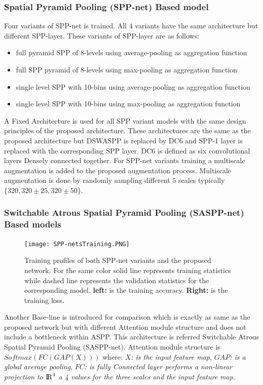 \subsubsection{Spatial Pyramid Pooling (SPP-net) Based model}
Four variants of SPP-net\cite{he2015spatial} is trained. All $4$ variants have the same architecture but different SPP-layer. These variants of SPP-layer are as follows:
\begin{itemize}
  \item full pyramid SPP of 8-levels using average-pooling as aggregation function
  \item full SPP pyramid of 8-levels using max-pooling as aggregation function
  \item single level SPP with 10-bins using average-pooling as aggregation function
  \item single level SPP with 10-bins using max-pooling as aggregation function
\end{itemize}
  A Fixed Architecture is used for all SPP variant models with the same design principles of the proposed architecture. These architectures are the same as the proposed architecture but DSWASPP is replaced by DC6 and SPP-1 layer is replaced with the corresponding SPP layer. DC6 is defined as six convolutional layers Densely connected together. For SPP-net variants training a multiscale augmentation is added to the proposed augmentation process. Multiscale augmentation is done by randomly sampling different $5$ scales typically $\{320, 320\pm25, 320\pm50 \}$.
\subsubsection{Switchable Atrous Spatial Pyramid Pooling (SASPP-net) Based models} 
\begin{center}
\begin{figure}[htbp]
\centerline{\texttt{[image: SPP-netsTraining.PNG]}}
\caption{Training profiles of both SPP-net variants and the proposed network. For the same color solid line represents training statistics while dashed line represents the validation statistics for the corresponding model. \textbf{left:} is the training accuracy. \textbf{Right:} is the training loss.}
\label{SPP-train}
\end{figure}
\end{center}

Another Base-line is introduced for comparison which is exactly as same as the proposed network but with different Attention module structure and does not include a bottleneck within ASPP. This architecture is referred Switchable Atrous Spatial Pyramid Pooling (SASPP-net). Attention module structure is $Softmax(FC(GAP(X)))$ where: \textit{$X$: is the input feature map}, \textit{$GAP$: is a global average pooling}, \textit{$FC$: is fully Connected layer performs a non-linear projection to ${\rm I\!R}^{4}$ a 4 values for the three scales and the input feature map}.\\

